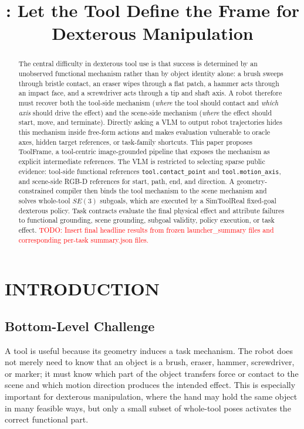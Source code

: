 \documentclass[letterpaper, 10 pt, conference]{ieeeconf}
\title{\LARGE \bf
\method{}: Let the Tool Define the Frame for Dexterous Manipulation
}
\author{}
\newcommand{\todo}[1]{\textcolor{red}{TODO: #1}}
\newcommand{\method}{ToolFrame}
\begin{document}
\maketitle
\thispagestyle{empty}
\pagestyle{empty}

\begin{abstract}
The central difficulty in dexterous tool use is that success is determined by
an unobserved functional mechanism rather than by object identity alone: a
brush sweeps through bristle contact, an eraser wipes through a flat patch, a
hammer acts through an impact face, and a screwdriver acts through a tip and
shaft axis. A robot therefore must recover both the tool-side mechanism
(\emph{where} the tool should contact and \emph{which axis} should drive the
effect) and the scene-side mechanism (\emph{where} the effect should start,
move, and terminate). Directly asking a VLM to output robot trajectories hides
this mechanism inside free-form actions and makes evaluation vulnerable to
oracle axes, hidden target references, or task-family shortcuts. This paper
proposes \method{}, a tool-centric image-grounded pipeline that exposes the
mechanism as explicit intermediate references. The VLM is restricted to
selecting sparse public evidence: tool-side functional references
\texttt{tool.contact\_point} and \texttt{tool.motion\_axis}, and scene-side
RGB-D references for start, path, end, and direction. A geometry-constrained
compiler then binds the tool mechanism to the scene mechanism and solves
whole-tool $SE(3)$ subgoals, which are executed by a SimToolReal fixed-goal
dexterous policy. Task contracts evaluate the final physical effect and
attribute failures to functional grounding, scene grounding, subgoal validity,
policy execution, or task effect. \todo{Insert final headline results from
frozen launcher\_summary files and corresponding per-task summary.json files.}
\end{abstract}

\section{INTRODUCTION}

\subsection{Bottom-Level Challenge}
A tool is useful because its geometry induces a task mechanism. The robot does
not merely need to know that an object is a brush, eraser, hammer,
screwdriver, or marker; it must know which part of the object transfers force
or contact to the scene and which motion direction produces the intended
effect. This is especially important for dexterous manipulation, where the hand
may hold the same object in many feasible ways, but only a small subset of
whole-tool poses activates the correct functional part.
\end{document}
